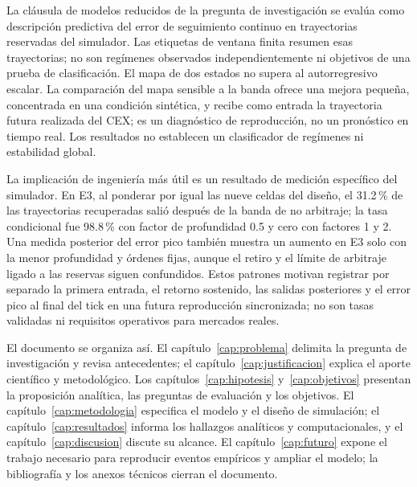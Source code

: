 La cláusula de modelos reducidos de la pregunta de investigación se evalúa como descripción predictiva del error de seguimiento continuo en trayectorias reservadas del simulador. Las etiquetas de ventana finita resumen esas trayectorias; no son regímenes observados independientemente ni objetivos de una prueba de clasificación. El mapa de dos estados no supera al autorregresivo escalar. La comparación del mapa sensible a la banda ofrece una mejora pequeña, concentrada en una condición sintética, y recibe como entrada la trayectoria futura realizada del CEX; es un diagnóstico de reproducción, no un pronóstico en tiempo real. Los resultados no establecen un clasificador de regímenes ni estabilidad global.

La implicación de ingeniería más útil es un resultado de medición específico del simulador. En E3, al ponderar por igual las nueve celdas del diseño, el 31.2\,\% de las trayectorias recuperadas salió después de la banda de no arbitraje; la tasa condicional fue 98.8\,\% con factor de profundidad 0.5 y cero con factores 1 y 2. Una medida posterior del error pico también muestra un aumento en E3 solo con la menor profundidad y órdenes fijas, aunque el retiro y el límite de arbitraje ligado a las reservas siguen confundidos. Estos patrones motivan registrar por separado la primera entrada, el retorno sostenido, las salidas posteriores y el error pico al final del tick en una futura reproducción sincronizada; no son tasas validadas ni requisitos operativos para mercados reales.

El documento se organiza así. El capítulo~\ref{cap:problema} delimita la pregunta de investigación y revisa antecedentes; el capítulo~\ref{cap:justificacion} explica el aporte científico y metodológico. Los capítulos~\ref{cap:hipotesis} y~\ref{cap:objetivos} presentan la proposición analítica, las preguntas de evaluación y los objetivos. El capítulo~\ref{cap:metodologia} especifica el modelo y el diseño de simulación; el capítulo~\ref{cap:resultados} informa los hallazgos analíticos y computacionales, y el capítulo~\ref{cap:discusion} discute su alcance. El capítulo~\ref{cap:futuro} expone el trabajo necesario para reproducir eventos empíricos y ampliar el modelo; la bibliografía y los anexos técnicos cierran el documento.
